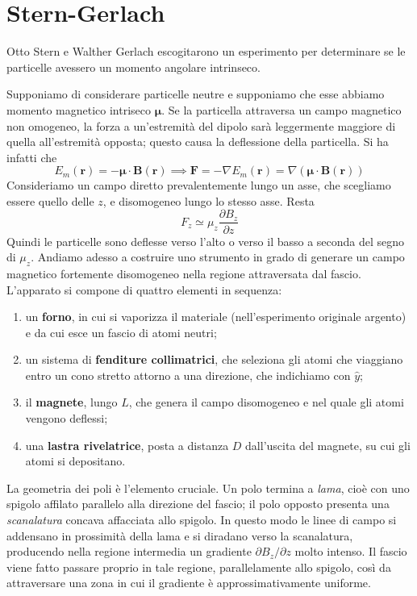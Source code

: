 \section{Stern-Gerlach}

Otto Stern e Walther Gerlach escogitarono un esperimento per determinare se le particelle avessero un momento angolare intrinseco. 

Supponiamo di considerare particelle neutre e supponiamo che esse abbiamo momento magnetico intriseco $\mathbf{\mu}$. 
Se la particella attraversa un campo magnetico non omogeneo, la forza a un'estremità del dipolo sarà leggermente maggiore di quella all'estremità opposta; questo causa la deflessione della particella. Si ha infatti che 
%
\begin{equation}
    E_m(\mathbf{r}) = - \mathbf{\mu} \cdot \mathbf{B}(\mathbf{r}) \implies \mathbf{F} = - \nabla E_m(\mathbf{r}) = \nabla (\mathbf{\mu} \cdot \mathbf{B}(\mathbf{r}))
\end{equation}
Consideriamo un campo diretto prevalentemente lungo un asse, che scegliamo
essere quello delle $z$, e disomogeneo lungo lo stesso asse. Resta
%
\begin{equation}
    F_z \simeq \mu_z \frac{\partial B_z}{\partial z}
\end{equation}
%
Quindi le particelle sono deflesse verso l'alto o verso il basso a seconda del
segno di $\mu_z$.
Andiamo adesso a costruire uno strumento in grado di generare un campo magnetico fortemente disomogeneo nella regione attraversata dal fascio.\\
L'apparato si compone di quattro elementi in sequenza:
%
\begin{enumerate}
    \item un \textbf{forno}, in cui si vaporizza il materiale (nell'esperimento originale argento) e da cui esce un fascio di atomi neutri;
    \item un sistema di \textbf{fenditure collimatrici}, che seleziona gli atomi che viaggiano entro un cono stretto attorno a una direzione, che indichiamo con $\hat{y}$;
    \item il \textbf{magnete}, lungo $L$, che genera il campo disomogeneo e nel quale gli atomi vengono deflessi;
    \item una \textbf{lastra rivelatrice}, posta a distanza $D$ dall'uscita del magnete, su cui gli atomi si depositano.
\end{enumerate}

La geometria dei poli è l'elemento cruciale. Un polo termina a \emph{lama}, cioè con uno spigolo affilato parallelo alla direzione del fascio; il polo opposto presenta una \emph{scanalatura} concava affacciata allo spigolo. 
In questo modo le linee di campo si addensano in prossimità della lama e si diradano verso la scanalatura, producendo nella regione intermedia un gradiente $\partial B_z / \partial z$ molto intenso. Il fascio viene fatto passare proprio in tale regione, parallelamente allo spigolo, così da attraversare una zona in cui il gradiente è approssimativamente uniforme.

